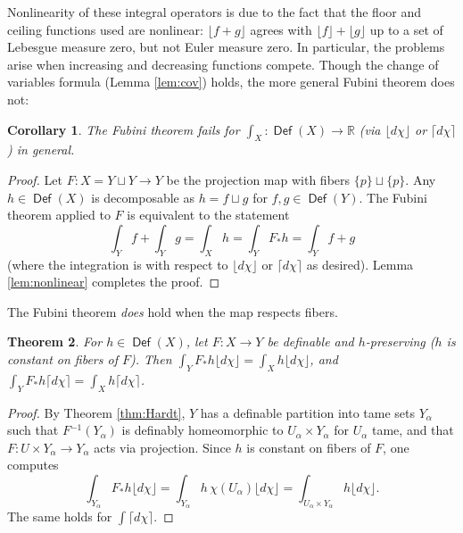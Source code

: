 \documentclass{psapm-l}
\newtheorem{theorem}{Theorem}[section]
\newtheorem{corollary}[theorem]{Corollary}
\theoremstyle{definition}
\theoremstyle{remark}
\numberwithin{equation}{section}
\begin{document}
Nonlinearity of these integral operators is due to the fact that the floor and ceiling functions used are nonlinear: $\lfloor f+g \rfloor$ agrees with $\lfloor f \rfloor + \lfloor g \rfloor$ up to a set of Lebesgue measure zero, but not  Euler measure zero. In particular, the problems arise when increasing and decreasing functions compete. Though the change of variables formula (Lemma \ref{lem:cov}) holds, the more general Fubini theorem does not:
\begin{corollary}
\label{cor:fubinifail}
The Fubini theorem fails for $\int_X\colon{{{\operatorname{\mathsf{{Def}}}}}}(X)\to{{\mathbb R}}$ (via ${{\lfloor d\chi\rfloor}}$ or ${{\lceil d\chi\rceil}}$) in general.
\end{corollary}
\begin{proof}
Let $F\colon X=Y\sqcup Y\to Y$ be the projection map with fibers $\{p\}\sqcup\{p\}$. Any $h\in{{{\operatorname{\mathsf{{Def}}}}}}(X)$ is decomposable as $h=f\sqcup g$ for $f,g\in{{{\operatorname{\mathsf{{Def}}}}}}(Y)$. The Fubini theorem applied to $F$ is equivalent to the statement
\[
    \int_Y f + \int_Y g = \int_X h = \int_Y F_*h = \int_Y f+g
\]
(where the integration is with respect to ${{\lfloor d\chi\rfloor}}$ or ${{\lceil d\chi\rceil}}$ as desired). Lemma \ref{lem:nonlinear} completes the proof.
\end{proof}

The Fubini theorem {\em does} hold when the map respects fibers.

\begin{theorem}
\label{thm:r-fubini}
For $h\in{{{\operatorname{\mathsf{{Def}}}}}}(X)$, let $F\colon X\to Y$ be definable and $h$-preserving ($h$ is constant on fibers of $F$). Then $\int_Y F_*h{{\lfloor d\chi\rfloor}} = \int_X h{{\lfloor d\chi\rfloor}}$, and $\int_Y F_*h{{\lceil d\chi\rceil}} = \int_X h{{\lceil d\chi\rceil}}$.
\end{theorem}
\begin{proof}
By Theorem \ref{thm:Hardt}, $Y$ has a definable partition into tame sets $Y_\alpha$ such that $F{^{-1}}(Y_\alpha)$ is definably homeomorphic to $U_\alpha\times Y_\alpha$ for $U_\alpha$ tame, and that $F:U\times Y_\alpha\to Y_\alpha$ acts via projection. Since $h$ is constant on fibers of $F$, one computes
\[
    \int_{Y_\alpha}F_*h{{\lfloor d\chi\rfloor}}
    =
    \int_{Y_\alpha}h\,\chi(U_\alpha){{\lfloor d\chi\rfloor}}
    =
    \int_{U_\alpha\times Y_\alpha}h{{\lfloor d\chi\rfloor}} .
\]
The same holds for $\int{{\lceil d\chi\rceil}}$.
\end{proof}
\end{document}
